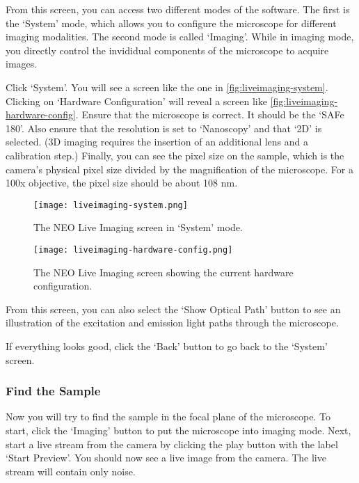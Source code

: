 \documentclass[10pt,a4paper,oneside]{book}
\begin{document}
From this screen, you can access two different modes of the software. The first is the `System' mode, which allows you to configure the microscope for different imaging modalities. The second mode is called `Imaging'. While in imaging mode, you directly control the invididual components of the microscope to acquire images.

Click `System'. You will see a screen like the one in \autoref{fig:liveimaging-system}. Clicking on `Hardware Configuration' will reveal a screen like \autoref{fig:liveimaging-hardware-config}. Ensure that the microscope is correct. It should be the `SAFe 180'. Also ensure that the resolution is set to `Nanoscopy' and that `2D' is selected. (3D imaging requires the insertion of an additional lens and a calibration step.) Finally, you can see the pixel size on the sample, which is the camera's physical pixel size divided by the magnification of the microscope. For a 100x objective, the pixel size should be about 108 nm.

\begin{figure}[ht]
    \centering
    \texttt{[image: liveimaging-system.png]}
    \caption{The NEO Live Imaging screen in `System' mode.}
    \label{fig:liveimaging-system}
\end{figure}

\begin{figure}[ht]
    \centering
    \texttt{[image: liveimaging-hardware-config.png]}
    \caption{The NEO Live Imaging screen showing the current hardware configuration.}
    \label{fig:liveimaging-hardware-config}
\end{figure}

From this screen, you can also select the `Show Optical Path' button to see an illustration of the excitation and emission light paths through the microscope.

If everything looks good, click the `Back' button to go back to the `System' screen.

\subsubsection{Find the Sample}

\newline

Now you will try to find the sample in the focal plane of the microscope. To start, click the `Imaging' button to put the microscope into imaging mode. Next, start a live stream from the camera by clicking the play button with the label `Start Preview'. You should now see a live image from the camera. The live stream will contain only noise.
\end{document}
